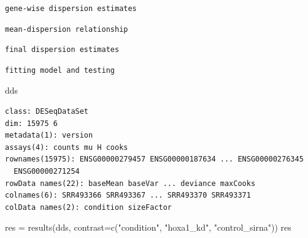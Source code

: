 \documentclass[
  letterpaper,
  DIV=11,
  numbers=noendperiod]{scrartcl}
\newenvironment{Shaded}{\begin{snugshade}}{\end{snugshade}}
\newcommand{\AttributeTok}[1]{\textcolor[rgb]{0.40,0.45,0.13}{#1}}
\newcommand{\FunctionTok}[1]{\textcolor[rgb]{0.28,0.35,0.67}{#1}}
\newcommand{\NormalTok}[1]{\textcolor[rgb]{0.00,0.23,0.31}{#1}}
\newcommand{\OtherTok}[1]{\textcolor[rgb]{0.00,0.23,0.31}{#1}}
\newcommand{\StringTok}[1]{\textcolor[rgb]{0.13,0.47,0.30}{#1}}
\begin{document}
\begin{verbatim}
gene-wise dispersion estimates
\end{verbatim}

\begin{verbatim}
mean-dispersion relationship
\end{verbatim}

\begin{verbatim}
final dispersion estimates
\end{verbatim}

\begin{verbatim}
fitting model and testing
\end{verbatim}

\begin{Shaded}
\begin{Highlighting}[]
\NormalTok{dds}
\end{Highlighting}
\end{Shaded}

\begin{verbatim}
class: DESeqDataSet 
dim: 15975 6 
metadata(1): version
assays(4): counts mu H cooks
rownames(15975): ENSG00000279457 ENSG00000187634 ... ENSG00000276345
  ENSG00000271254
rowData names(22): baseMean baseVar ... deviance maxCooks
colnames(6): SRR493366 SRR493367 ... SRR493370 SRR493371
colData names(2): condition sizeFactor
\end{verbatim}

\begin{Shaded}
\begin{Highlighting}[]
\NormalTok{res }\OtherTok{=} \FunctionTok{results}\NormalTok{(dds, }\AttributeTok{contrast=}\FunctionTok{c}\NormalTok{(}\StringTok{"condition"}\NormalTok{, }\StringTok{"hoxa1\_kd"}\NormalTok{, }\StringTok{"control\_sirna"}\NormalTok{))}
\NormalTok{res}
\end{Highlighting}
\end{Shaded}
\end{document}
